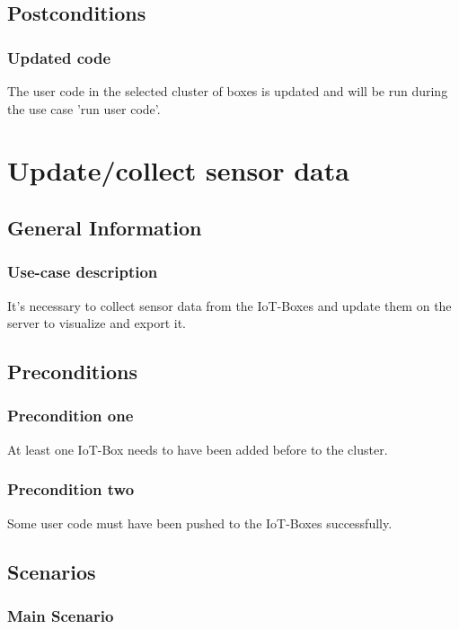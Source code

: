 \documentclass[notitlepage]{article}
\begin{document}
\subsection{Postconditions}

\subsubsection{Updated code}
The user code in the selected cluster of boxes is updated and will be run during the use case 'run user code'.

\section{Update/collect sensor data}

\subsection{General Information}
\subsubsection{Use-case description}
It's necessary to collect sensor data from the IoT-Boxes and update them on the server to visualize and export it. 

\subsection{Preconditions}

\subsubsection{Precondition one}
At least one IoT-Box needs to have been added before to the cluster.

\subsubsection{Precondition two}
Some user code must have been pushed to the IoT-Boxes successfully.

\subsection{Scenarios}

\subsubsection{Main Scenario}
\end{document}
